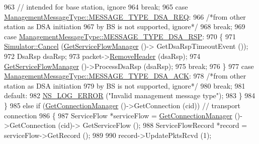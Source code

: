 \begin{DoxyCode}
963               \textcolor{comment}{// intended for base station, ignore}
964               \textcolor{keywordflow}{break};
965             \textcolor{keywordflow}{case} \hyperlink{classns3_1_1ManagementMessageType_a0e0c7a1e263538f0379d1bdb015abe3da41f2a4c34e30fc87da1d91ee4d4a063b}{ManagementMessageType::MESSAGE\_TYPE\_DSA\_REQ}:
966               \textcolor{comment}{/*from other station as DSA initiation}
967 \textcolor{comment}{               by BS is not supported, ignore*/}
968               \textcolor{keywordflow}{break};
969             \textcolor{keywordflow}{case} \hyperlink{classns3_1_1ManagementMessageType_a0e0c7a1e263538f0379d1bdb015abe3dafcc36bf51cd0bf98daaa56183458c2af}{ManagementMessageType::MESSAGE\_TYPE\_DSA\_RSP}:
970               \{
971                 \hyperlink{classns3_1_1Simulator_a1b903a62d6117ef28f7ba3c6500689bf}{Simulator::Cancel} (\hyperlink{classns3_1_1SubscriberStationNetDevice_a7ad10073f7d4779df6e87e4a3766701a}{GetServiceFlowManager} ()->
      GetDsaRspTimeoutEvent ());
972                 DsaRsp dsaRsp;
973                 packet->\hyperlink{classns3_1_1Packet_a0961eccf975d75f902d40956c93ba63e}{RemoveHeader} (dsaRsp);
974                 \hyperlink{classns3_1_1SubscriberStationNetDevice_a7ad10073f7d4779df6e87e4a3766701a}{GetServiceFlowManager} ()->ProcessDsaRsp (dsaRsp);
975                 \textcolor{keywordflow}{break};
976               \}
977             \textcolor{keywordflow}{case} \hyperlink{classns3_1_1ManagementMessageType_a0e0c7a1e263538f0379d1bdb015abe3dae1871841d7226eddeea335c608f68357}{ManagementMessageType::MESSAGE\_TYPE\_DSA\_ACK}:
978               \textcolor{comment}{/*from other station as DSA initiation}
979 \textcolor{comment}{               by BS is not supported, ignore*/}
980               \textcolor{keywordflow}{break};
981             \textcolor{keywordflow}{default}:
982               \hyperlink{group__logging_ga0261a8db1d4ac5f79417d117634fd455}{NS\_LOG\_ERROR} (\textcolor{stringliteral}{"Invalid management message type"});
983             \}
984         \}
985       \textcolor{keywordflow}{else} \textcolor{keywordflow}{if} (\hyperlink{classns3_1_1WimaxNetDevice_a25450b18f62f91e4c2ab08485bd171a2}{GetConnectionManager} ()->GetConnection (cid)) \textcolor{comment}{// transport connection}
986         \{
987           ServiceFlow *serviceFlow = \hyperlink{classns3_1_1WimaxNetDevice_a25450b18f62f91e4c2ab08485bd171a2}{GetConnectionManager} ()->GetConnection (cid)->
      GetServiceFlow ();
988           ServiceFlowRecord *record = serviceFlow->GetRecord ();
989 
990           record->UpdatePktsRcvd (1);

\end{DoxyCode}
